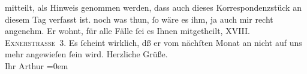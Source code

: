 \begin{ledgroupsized}[t]{13cm}
{{{                  mitteilt, als Hinweis genommen werden, dass auch dieses Korrespondenzstück an
                  diesem Tag verfasst ist.}}}\label{K_L00324_1h} noch was thun, ſo wäre es ihm, ja auch mir recht
               angenehm. Er wohnt, für alle Fälle ſei es Ihnen mitgetheilt, \textsc{XVIII. Exnerstraße 3}. Es ſcheint wirklich, dß er vom nächſten Monat {\pb}an
               nicht auf uns mehr angewieſen ſein wird.\pend
           \pstart
           Herzliche Grüße.{\\[\baselineskip]}Ihr \spacefill\mbox{Arthur}\pend
           \leftskip=0em{}          \endnumbering{}\end{ledgroupsized}  \newcommand{\dateiname}{L00324}\newcommand{\titel}{Arthur Schnitzler an Hugo von Hofmannsthal, [15. 5. 1894?]}\newcommand{\editorInnen}{Martin Anton Müller und Gerd-Hermann Susen}
            \footnotesize
\begin{ledgroupsized}[t]{11.5cm}
\end{ledgroupsized}
         
      
